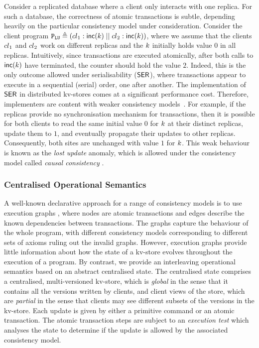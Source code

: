 Consider a replicated database where
a client only interacts with one replica.
For such a database, the 
correctness of atomic transactions is subtle, depending heavily on the
particular consistency model under consideration.  
Consider the client program
$\mathtt{P}_{\mathtt{LU}} \triangleq \left({cl}_1 : \mathsf{inc}(k) \;|| \; {cl}_2:
  \mathsf{inc}(k) \right)$, 
where we assume that the clients \( {cl}_1 \) and \( {cl}_2 \) work on different replicas and
the \(k\) initially holds value \(0\) in all replicas.
Intuitively, since transactions are executed atomically, after both
calls to \(\mathsf{inc}(k)\) have terminated, the counter should hold 
the value \(2\).
Indeed, this is the only outcome allowed under serialisability (\(\mathsf{SER}\)), where transactions
appear to execute in a sequential (serial) order, one after another.
The implementation of \(\mathsf{SER}\) in distributed kv-stores comes at a
significant performance cost. Therefore, implementers are content with
{weaker} consistency models~\cite{tango,CORFU,ramp,rola,cops,wren,redblue,PSI,NMSI,gdur,clocksi,distrsi}. 
For example, if the replicas provide no synchronisation mechanism for transactions,
then it is possible for both clients to read the same initial value \(0\) for \(k\) at their
distinct replicas, update them to \(1\), and eventually propagate their updates to other replicas. 
Consequently, both
sites  are unchanged with value  \(1\) for \(k\).
This weak behaviour is known as the \emph{lost update} anomaly, which
is  allowed under the consistency model called {\em causal consistency} \cite{cops,wren,redblue}.



\subsubsection{Centralised Operational Semantics}
A well-known declarative approach for a range of consistency models
is to use execution graphs \cite{adya-icde,adya,framework-concur,ev_transactions},
where nodes are atomic transactions and edges describe the
known dependencies between transactions. The graphs capture the
behaviour of the whole program, with different consistency models
corresponding to different sets of axioms ruling out the invalid graphs. 
However, execution graphs provide little information about how the 
state of a kv-store evolves throughout the execution of a program.
By contrast, we provide an interleaving operational semantics based on an
abstract centralised state. The centralised state comprises a
centralised, multi-versioned kv-store, which is {\em global} in the
sense that it contains all the versions written by clients, and client views of the store,
which are {\em partial} in the sense that clients may see different 
subsets of the versions in the kv-store. Each update is given by either
a primitive command or an atomic transaction. The atomic
transaction steps are subject to an {\em execution test} which
analyses the state to determine if the update is allowed by 
the associated  consistency model. 



